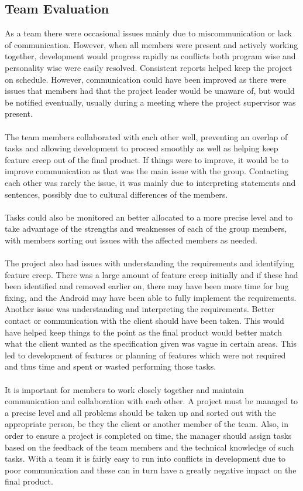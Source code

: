 \documentclass[12pt, portrait]{article}
\begin{document}
\subsection{Team Evaluation}
As a team there were occasional issues mainly due to miscommunication or lack of communication. However, when all members were present and actively working together, development would progress rapidly as conflicts both program wise and personality wise were easily resolved. Consistent reports helped keep the project on schedule. However, communication could have been improved as there were issues that members had that the project leader would be unaware of, but would be notified eventually, usually during a meeting where the project supervisor was present. 
~\\\\
The team members collaborated with each other well, preventing an overlap of tasks and allowing development to proceed smoothly as well as helping keep feature creep out of the final product. If things were to improve, it would be to improve communication as that was the main issue with the group. Contacting each other was rarely the issue, it was mainly due to interpreting statements and sentences, possibly due to cultural differences of the members.
~\\\\
Tasks could also be monitored an better allocated to a more precise level and to take advantage of the strengths and weaknesses of each of the group members, with members sorting out issues with the affected members as needed.
~\\\\
The project also had issues with understanding the requirements and identifying feature creep. There was a large amount of feature creep initially and if these had been identified and removed earlier on, there may have been more time for bug fixing, and the Android may have been able to fully implement the requirements. Another issue was understanding and interpreting the requirements. Better contact or communication with the client should have been taken. This would have helped keep things to the point as the final product would better match what the client wanted as the specification given was vague in certain areas. This led to development of features or planning of features which were not required and thus time and spent or wasted performing those tasks.
~\\\\
It is important for members to work closely together and maintain communication and collaboration with each other. A project must be managed to a precise level and all problems should be taken up and sorted out with the appropriate person, be they the client or another member of the team. Also, in order to ensure a project is completed on time, the manager should assign tasks based on the feedback of the team members and the technical knowledge of such tasks. With a team it is fairly easy to run into conflicts in development due to poor communication and these can in turn have a greatly negative impact on the final product.
\newpage
\end{document}
